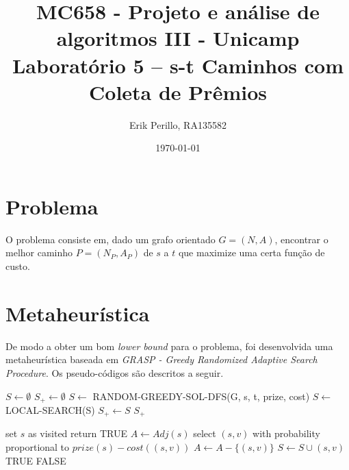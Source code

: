 \documentclass[7pt]{article}
\newcommand{\tit}[1]{\textit{#1}}
\newcommand{\tbf}[1]{\textbf{#1}}
\begin{document}
\author{\small Erik Perillo, RA135582}
\date{\small \today}
\title{\vspace{-2cm}%
	{\small MC658 - Projeto e análise de algoritmos III - Unicamp}\\
    {\Large \tbf{Laboratório 5 -- s-t Caminhos com Coleta de Prêmios}}}
\maketitle\vspace{-0.5cm}

\makeatletter
\def\BState{\State\hskip-\ALG@thistlm}
\makeatother

\begin{multicols}{2}

\section{Problema}
O problema consiste em, dado um grafo orientado $G = (N, A)$, encontrar o
melhor caminho $P = (N_P, A_P)$ de $s$ a $t$ que maximize uma certa
função de custo.

\section{Metaheurística}
De modo a obter um bom \tit{lower bound} para o problema, foi desenvolvida
uma metaheurística baseada em
\tit{GRASP - Greedy Randomized Adaptive Search Procedure}.
Os pseudo-códigos são descritos a seguir.
\end{multicols}

\begin{algorithm}
\caption{}\label{grasp}
\begin{algorithmic}[1]
    \State $S \gets \emptyset$
    \State $S_+ \gets \emptyset$
        \State $S \gets$ RANDOM-GREEDY-SOL-DFS(G, s, t, prize, cost)
        \State $S \gets$ LOCAL-SEARCH(S)
            \State $S_+ \gets S$
        \EndIf
	\EndFor
    \Return $S_+$
    \EndProcedure
\end{algorithmic}
\end{algorithm}

\begin{algorithm}
\caption{}\label{random-dfs}
\begin{algorithmic}[1]
    \State set $s$ as visited
        \State return TRUE
    \EndIf
    \State $A \gets Adj(s)$
        \State select $(s, v)$ with probability proportional to
            $prize(s) - cost((s,v))$
        \State $A \gets A - \{(s, v)\}$
            \State $S \gets S \cup {(s, v)}$
            \State \Return TRUE
        \EndIf
    \EndWhile
    \State \Return FALSE
    \EndProcedure
\end{algorithmic}
\end{algorithm}
\end{document}
